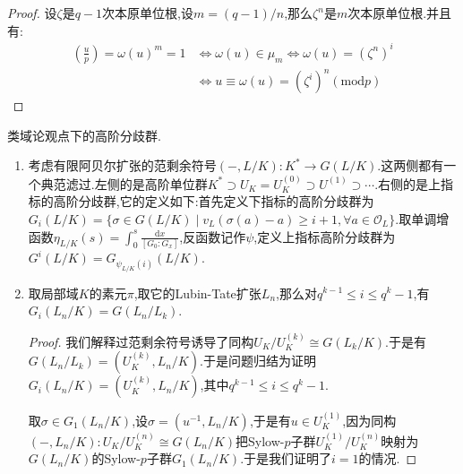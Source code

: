 \begin{enumerate}
\begin{proof}
    	设$\zeta$是$q-1$次本原单位根,设$m=(q-1)/n$,那么$\zeta^n$是$m$次本原单位根.并且有:
    	\begin{align*}
    	\left(\frac{u}{p}\right)=\omega(u)^m=1&\Leftrightarrow\omega(u)\in\mu_m\Leftrightarrow\omega(u)=(\zeta^n)^i\\&\Leftrightarrow u\equiv\omega(u)=(\zeta^i)^n(\mathrm{mod}p)
    	\end{align*}
    \end{proof}
\end{enumerate}

类域论观点下的高阶分歧群.
\begin{enumerate}
	\item 考虑有限阿贝尔扩张的范剩余符号$(-,L/K):K^*\to G(L/K)$.这两侧都有一个典范滤过.左侧的是高阶单位群$K^*\supset U_K=U_K^{(0)}\supset U^{(1)}\supset\cdots$.右侧的是上指标的高阶分歧群,它的定义如下:首先定义下指标的高阶分歧群为$G_i(L/K)=\{\sigma\in G(L/K)\mid v_L(\sigma(a)-a)\ge i+1,\forall a\in\mathscr{O}_L\}$.取单调增函数$\eta_{L/K}(s)=\int_0^s\frac{\mathrm{d}x}{[G_0:G_x]}$,反函数记作$\psi$,定义上指标高阶分歧群为$G^i(L/K)=G_{\psi_{L/K}(i)}(L/K)$.
	\item 取局部域$K$的素元$\pi$,取它的Lubin-Tate扩张$L_n$,那么对$q^{k-1}\le i\le q^k-1$,有$G_i(L_n/K)=G(L_n/L_k)$.
	\begin{proof}
		
		我们解释过范剩余符号诱导了同构$U_K/U_K^{(k)}\cong G(L_k/K)$.于是有$G(L_n/L_k)=(U_K^{(k)},L_n/K)$.于是问题归结为证明$G_i(L_n/K)=(U_K^{(k)},L_n/K)$,其中$q^{k-1}\le i\le q^k-1$.
		
		取$\sigma\in G_1(L_n/K)$,设$\sigma=(u^{-1},L_n/K)$,于是有$u\in U_K^{(1)}$,因为同构$(-,L_n/K):U_K/U_K^{(n)}\cong G(L_n/K)$把Sylow-$p$子群$U_K^{(1)}/U_K^{(n)}$映射为$G(L_n/K)$的Sylow-$p$子群$G_1(L_n/K)$.于是我们证明了$i=1$的情况.
		

\end{proof}
\end{enumerate}

